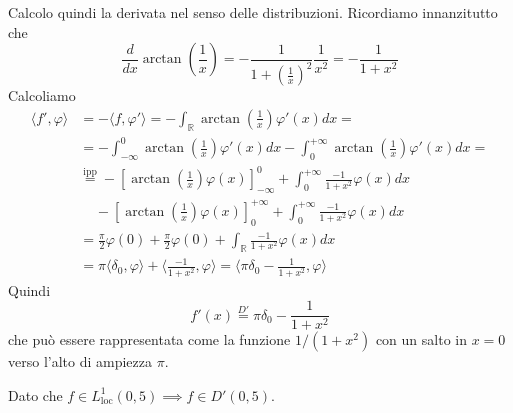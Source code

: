Calcolo quindi la derivata nel senso delle distribuzioni. Ricordiamo innanzitutto che
\begin{equation*}
\frac{d}{dx}\arctan\left(\frac{1}{x}\right) =-\frac{1}{1+\left(\frac{1}{x}\right)^{2}}\frac{1}{x^{2}} =-\frac{1}{1+x^{2}}
\end{equation*}
Calcoliamo
\begin{align*}
\langle f',\varphi \rangle  & =-\langle f,\varphi '\rangle =-\int _{\mathbb{R}}\arctan\left(\frac{1}{x}\right) \varphi '(x)dx=\\
 & =-\int ^{0}_{-\infty }\arctan\left(\frac{1}{x}\right) \varphi '(x)dx-\int ^{+\infty }_{0}\arctan\left(\frac{1}{x}\right) \varphi '(x)dx=\\
 & \overset{\text{ipp}}{=} -\left[\arctan\left(\frac{1}{x}\right) \varphi (x)\right]^{0}_{-\infty } +\int ^{+\infty }_{0}\frac{-1}{1+x^{2}} \varphi ( x) dx\\
 & \ \ \ \ \ -\left[\arctan\left(\frac{1}{x}\right) \varphi (x)\right]^{+\infty }_{0} +\int ^{+\infty }_{0}\frac{-1}{1+x^{2}} \varphi ( x) dx\\
 & =\frac{\pi }{2} \varphi ( 0) +\frac{\pi }{2} \varphi ( 0) +\int _{\mathbb{R}}\frac{-1}{1+x^{2}} \varphi (x)dx\\
 & =\pi \langle \delta _{0} ,\varphi \rangle +\langle \frac{-1}{1+x^{2}} ,\varphi \rangle =\langle \pi \delta _{0} -\frac{1}{1+x^{2}} ,\varphi \rangle 
\end{align*}
Quindi
\begin{equation*}
f'(x)\overset{D'}{=} \pi \delta _{0} -\frac{1}{1+x^{2}}
\end{equation*}
che può essere rappresentata come la funzione $1/\left( 1+x^{2}\right)$ con un salto in $x=0$ verso l'alto di ampiezza $\pi $.
\Soluzione

Dato che $f\in L^{1}_{\mathrm{loc}} (0,5)\implies f\in D'(0,5)$.


